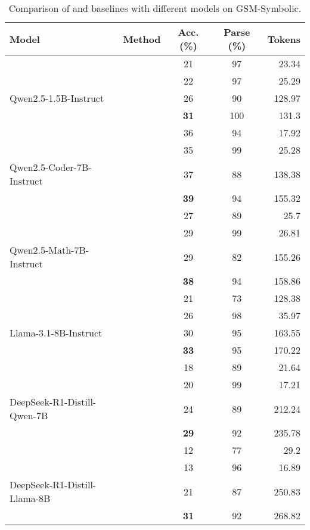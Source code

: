 \begin{table*}[t]
    \centering
    \caption{Comparison of \Tool{} and baselines with different models on GSM-Symbolic.}
    \begin{tabular}{llccr}
        \toprule
        \textbf{Model} & \textbf{Method} & \textbf{Acc. (\%)} & \textbf{Parse (\%)} &  \textbf{Tokens} \\
        
\midrule
     & \stdUnconstrained{} & 21 & 97 & 23.34\\
 & \stdConstrained{} & 22 & 97 & 25.29 \\
 Qwen2.5-1.5B-Instruct & \cotUnconstrained{} & 26 & 90 & 128.97\\
 & \textbf{\Tool{}} & \textbf{31} & 100 & 131.3\\

\midrule

    & \stdUnconstrained{} & 36 & 94 & 17.92 \\
 & \stdConstrained{} & 35 & 99 & 25.28  \\
 Qwen2.5-Coder-7B-Instruct & \cotUnconstrained{} & 37 & 88 & 138.38 \\
 & \textbf{\Tool{}} & \textbf{39} & 94 & 155.32\\


\midrule

     & \stdUnconstrained{} & 27 & 89 & 25.7 \\
 & \stdConstrained{} & 29 & 99 & 26.81  \\
 Qwen2.5-Math-7B-Instruct & \cotUnconstrained{} & 29 & 82 & 155.26\\
 & \textbf{\Tool{}} & \textbf{38} & 94 & 158.86 \\

 \midrule

     & \stdUnconstrained{} & 21 & 73 & 128.38\\
 & \stdConstrained{} & 26 & 98 & 35.97 \\
 Llama-3.1-8B-Instruct & \cotUnconstrained{} & 30 & 95 & 163.55 \\
 & \textbf{\Tool{}} & \textbf{33} & 95 & 170.22 \\
 \midrule
     & \stdUnconstrained{} & 18 & 89 & 21.64\\
 & \stdConstrained{} & 20 & 99 & 17.21 \\
DeepSeek-R1-Distill-Qwen-7B & \cotUnconstrained{} & 24 & 89 & 212.24 \\
  & \textbf{\Tool{}} & \textbf{29} & 92 & 235.78 \\

 \midrule
     & \stdUnconstrained{} & 12 & 77 & 29.2\\
 & \stdConstrained{} & 13 & 96 & 16.89 \\
DeepSeek-R1-Distill-Llama-8B & \cotUnconstrained{} & 21 & 87 & 250.83 \\
  & \textbf{\Tool{}} & \textbf{31} & 92 & 268.82 \\


\bottomrule
    \end{tabular}
    \label{tab:gsm_symbolic_comparison}
    \vspace{-.2in}
\end{table*}
